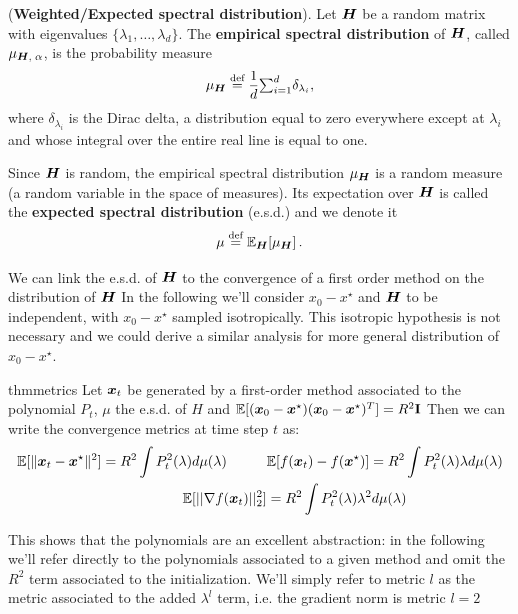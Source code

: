 \documentclass{article}
\begin{document}
\begin{definition}
(\textbf{Weighted/Expected spectral distribution}). 
Let ${\boldsymbol H}$ be a random matrix with eigenvalues $\{\lambda_1, \ldots, \lambda_d\}$. The \textbf{empirical spectral distribution} of ${\boldsymbol H}$, called ${\mu}_{{\boldsymbol H},\;\alpha}$, is the probability measure
\begin{equation}\label{eq:wighted_spectral_density}
    \mu_{{\boldsymbol H}} \stackrel{\text{def}}{=} \frac{1}{d}{\textstyle{\sum_{i=1}^d}} \delta_{\lambda_i},
\end{equation}
where $\delta_{\lambda_i}$ is the Dirac delta, a distribution equal to zero everywhere except at $\lambda_i$ and whose integral over the entire real line is equal to one.

Since ${\boldsymbol H}$ is random, the empirical spectral distribution $\mu_{\boldsymbol H}$ is a random measure (a random variable in the space of measures). Its expectation over ${\boldsymbol H}$ is called the \textbf{expected spectral distribution} (e.s.d.) and we denote it
\begin{equation}
\mu \stackrel{\text{def}}{=} {\mathbb{E}}_{{\boldsymbol H}}[\mu_{{\boldsymbol H}}]\,.
\end{equation}
\end{definition}

We can link the e.s.d. of ${\boldsymbol H}$ to the convergence of a first order method on the distribution of ${\boldsymbol H}$ In the following we'll consider $x_0-x^\star$ and ${\boldsymbol H}$ to be independent, with $x_0-x^\star$ sampled isotropically. This isotropic hypothesis is not necessary and we could derive a similar analysis for  more general distribution  of $x_0-x^\star$.

\begin{restatable}{thm}{metrics} \label{thm: metrics}
Let ${\boldsymbol x}_t$ be generated by a first-order method associated to the polynomial $P_t$,  $\mu$ the  e.s.d. of $H$ and $\mathbb{E}[({\boldsymbol x}_0-{\boldsymbol x}^\star)({\boldsymbol x}_0-{\boldsymbol x}^\star)^T]=R^2\textbf{I}$ Then we can write the convergence metrics at time step  $t$ as:
\begin{equation}
\begin{split}
\label{eq:error_norm_x}
  \mathbb{E}[\|{\boldsymbol x}_t-{\boldsymbol x}^\star\|^2] = { R^2} \int {P_t^2(\lambda) d\mu(\lambda)} \hspace{1 cm}
    &\mathbb{E}[f({\boldsymbol x}_t)-f({\boldsymbol x}^\star)]=R^2\int P_t^2(\lambda)\lambda d\mu(\lambda)\\
    \mathbb{E}[||\nabla f({\boldsymbol x}_t)||^2_2]&=R^2\int P_t^2(\lambda)\lambda^2d\mu(\lambda) 
\end{split}
\end{equation}
\end{restatable}
This shows that the polynomials are an excellent abstraction: in the following we'll refer directly to the polynomials associated to a given method and omit the $R^2$ term associated to the initialization. We'll simply refer to metric $l$ as the metric associated to the added $\lambda^l$ term, i.e. the gradient norm is metric $l=2$\\
\end{document}
